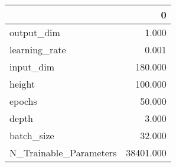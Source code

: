 \begin{tabular}{lr}
\toprule
{} &          0 \\
\midrule
output\_dim             &      1.000 \\
learning\_rate          &      0.001 \\
input\_dim              &    180.000 \\
height                 &    100.000 \\
epochs                 &     50.000 \\
depth                  &      3.000 \\
batch\_size             &     32.000 \\
N\_Trainable\_Parameters &  38401.000 \\
\bottomrule
\end{tabular}
